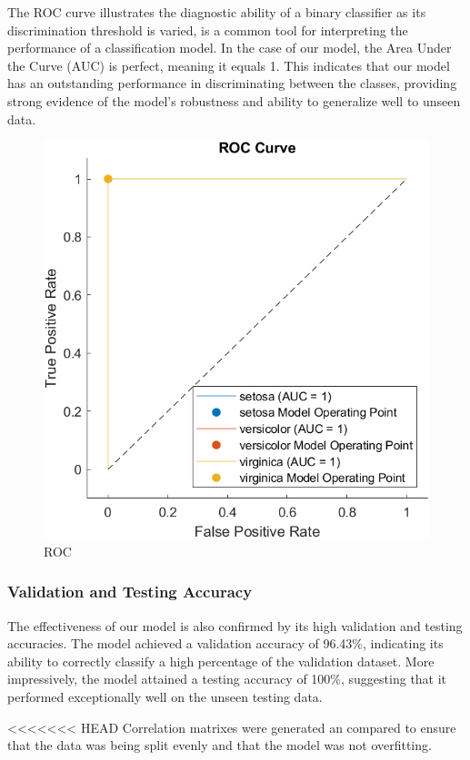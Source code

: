 \documentclass[conference]{inc/IEEEtran}
\begin{document}
The ROC curve illustrates the diagnostic ability of a binary classifier as its discrimination threshold is varied, is a common tool for interpreting the performance of a classification model. In the case of our model, the Area Under the Curve (AUC) is perfect, meaning it equals 1. This indicates that our model has an outstanding performance in discriminating between the classes, providing strong evidence of the model's robustness and ability to generalize well to unseen data.

\begin{figure}
  \includegraphics[width=0.8\linewidth]{figures/roc.png}
  \caption{ROC}
  \label{fig:boat1}
\end{figure}

\subsubsection{Validation and Testing Accuracy}

The effectiveness of our model is also confirmed by its high validation and testing accuracies. The model achieved a validation accuracy of 96.43\%, indicating its ability to correctly classify a high percentage of the validation dataset. More impressively, the model attained a testing accuracy of 100\%, suggesting that it performed exceptionally well on the unseen testing data.

<<<<<<< HEAD
Correlation matrixes were generated an compared to ensure that the data was being split evenly and that the model was not overfitting.
\end{document}
